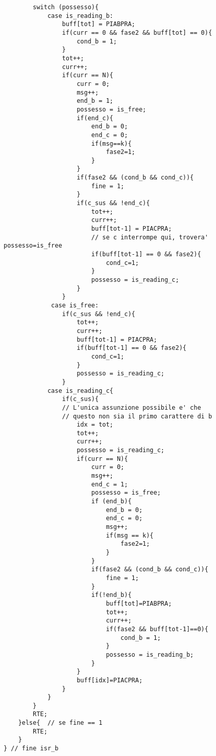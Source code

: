 \documentclass{article}
\begin{document}
\begin{lstlisting}
        switch (possesso){
            case is_reading_b:
                buff[tot] = PIABPRA;
                if(curr == 0 && fase2 && buff[tot] == 0){
                    cond_b = 1;
                }
                tot++;
                curr++;
                if(curr == N){
                    curr = 0;
                    msg++;
                    end_b = 1;
                    possesso = is_free;
                    if(end_c){
                        end_b = 0;
                        end_c = 0;
                        if(msg==k){
                            fase2=1;
                        }
                    }
                    if(fase2 && (cond_b && cond_c)){
                        fine = 1;
                    }
                    if(c_sus && !end_c){
                        tot++;
                        curr++;
                        buff[tot-1] = PIACPRA;
                        // se c interrompe qui, trovera' possesso=is_free
                        if(buff[tot-1] == 0 && fase2){
                            cond_c=1;
                        }
                        possesso = is_reading_c;
                    }
                }
             case is_free:
                if(c_sus && !end_c){
                    tot++;
                    curr++;
                    buff[tot-1] = PIACPRA;
                    if(buff[tot-1] == 0 && fase2){
                        cond_c=1;
                    }
                    possesso = is_reading_c;
                }
            case is_reading_c{
                if(c_sus){
                // L'unica assunzione possibile e' che 
                // questo non sia il primo carattere di b
                    idx = tot;
                    tot++;
                    curr++;
                    possesso = is_reading_c;
                    if(curr == N){
                        curr = 0;
                        msg++;
                        end_c = 1;
                        possesso = is_free;
                        if (end_b){
                            end_b = 0;
                            end_c = 0;
                            msg++;
                            if(msg == k){
                                fase2=1;
                            }
                        }
                        if(fase2 && (cond_b && cond_c)){
                            fine = 1;
                        }
                        if(!end_b){
                            buff[tot]=PIABPRA;
                            tot++;
                            curr++;
                            if(fase2 && buff[tot-1]==0){
                                cond_b = 1;
                            }
                            possesso = is_reading_b;
                        }
                    }
                    buff[idx]=PIACPRA;
                }
            }
        }   
        RTE;
    }else{  // se fine == 1
        RTE;
    }
} // fine isr_b 
\end{lstlisting}
\end{document}
